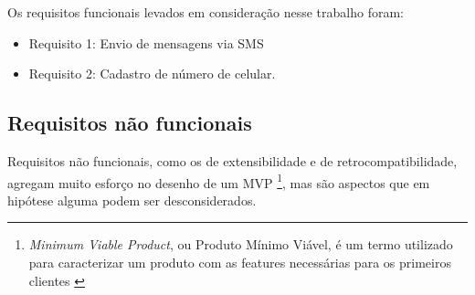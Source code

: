 Os requisitos funcionais levados em consideração nesse trabalho foram:

\begin{itemize}
	\item Requisito 1: Envio de mensagens via SMS \cite{SMS}
	
	\item Requisito 2: Cadastro de número de celular.
\end{itemize}

\subsection{Requisitos não funcionais}
\label{reqNaoFuncionais}

Requisitos não funcionais, como os de extensibilidade e de retrocompatibilidade, agregam muito esforço no desenho de um MVP \footnote{\textit{Minimum Viable Product}, ou Produto Mínimo Viável, é um termo utilizado para caracterizar um produto com as features necessárias para os primeiros clientes \cite{MVP}}, mas são aspectos que em hipótese alguma podem ser desconsiderados.